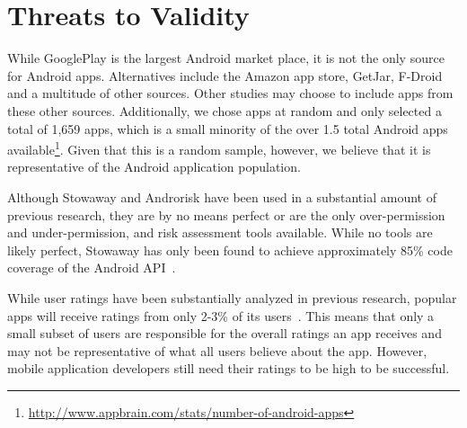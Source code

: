 \section{Threats to Validity}
\label{sec:threats}




While GooglePlay is the largest Android market place, it is not the only source for Android apps. Alternatives include the Amazon app store, GetJar, F-Droid and a multitude of other sources. Other studies may choose to include apps from these other sources. Additionally, we chose apps at random and only selected a total of 1,659 apps, which is a small minority of the over 1.5 total Android apps available\footnote{{\url{http://www.appbrain.com/stats/number-of-android-apps}}}. Given that this is a random sample, however, we believe that it is representative of the Android application population.

Although Stowaway and Androrisk have been used in a substantial amount of previous research, they are by no means perfect or are the only over-permission and under-permission, and risk assessment tools available. While no tools are likely perfect, Stowaway has only been found to achieve approximately 85\% code coverage of the Android API~\cite{Felt:2011:APD:2046707.2046779}.

While user ratings have been substantially analyzed in previous research, popular apps will receive ratings from only 2-3\% of its users~\cite{Yan:2011:APM:1999995.2000007}. This means that only a small subset of users are responsible for the overall ratings an app receives and may not be representative of what all users believe about the app. However, mobile application developers still need their ratings to be high to be successful.

